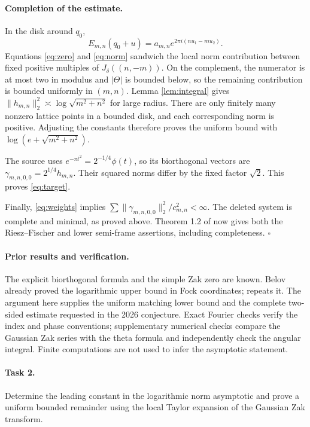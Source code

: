 \documentclass[11pt]{article}
\begin{document}
\paragraph{Completion of the estimate.}
In the disk around $q_0$,
\[
 E_{m,n}(q_0+u)=a_{m,n}e^{2\pi i(nu_1-mu_2)}.
\]
Equations \eqref{eq:zero} and \eqref{eq:norm} sandwich the local norm
contribution between fixed positive multiples of
$J_\delta((n,-m))$. On the complement, the numerator is at most two in
modulus and $|\Theta|$ is bounded below, so the remaining contribution
is bounded uniformly in $(m,n)$.
Lemma \ref{lem:integral} gives
$\|h_{m,n}\|_2^2\asymp\log\sqrt{m^2+n^2}$ for large radius.
There are only finitely many nonzero lattice points in a bounded disk,
and each corresponding norm is positive. Adjusting the constants
therefore proves the uniform bound with $\log(e+\sqrt{m^2+n^2})$.

The source uses $e^{-\pi t^2}=2^{-1/4}\phi(t)$, so its biorthogonal
vectors are $\gamma_{m,n,0,0}=2^{1/4}h_{m,n}$.
Their squared norms differ by the fixed factor $\sqrt2$.
This proves \eqref{eq:target}.

Finally, \eqref{eq:weights} implies
$\sum\|\gamma_{m,n,0,0}\|_2^2/c_{m,n}^2<\infty$.
The deleted system is complete and minimal, as proved above.
Theorem 1.2 of \cite{Z} now gives both the Riesz--Fischer and lower
semi-frame assertions, including completeness.
\hfill$\square$

\paragraph{Prior results and verification.}
The explicit biorthogonal formula and the simple Zak zero are known.
Belov \cite[equation (3.1)]{B} already proved the logarithmic upper
bound in Fock coordinates; \cite[Lemma 2.3]{BBB} repeats it.
The argument here supplies the uniform matching lower bound and the
complete two-sided estimate requested in the 2026 conjecture.
Exact Fourier checks verify the index and phase conventions; supplementary
numerical checks compare the Gaussian Zak series with the theta formula
and independently check the angular integral. Finite computations are
not used to infer the asymptotic statement.

\paragraph{Task 2.}
Determine the leading constant in the logarithmic norm asymptotic and
prove a uniform bounded remainder using the local Taylor expansion
of the Gaussian Zak transform.
\end{document}
